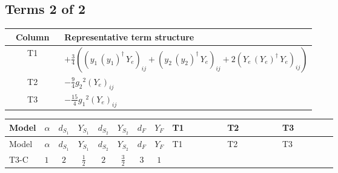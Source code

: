 \documentclass[8pt]{article}
\begin{document}
\begin{landscape}
\subsection*{Terms 2 of 2}
\begin{center}
\begin{tabular}{@{}c >{\raggedright\arraybackslash}p{0.82\linewidth}@{}}
\toprule
Column & Representative term structure \\
\midrule
T1 & \(\displaystyle +\frac{3}{4} (\left({y_1}\,\left({y_1}\right)^{\dagger}\,{Y_e}\right)_{ij}+\left({y_2}\,\left({y_2}\right)^{\dagger}\,{Y_e}\right)_{ij}+2 \left({Y_e}\,\left({Y_e}\right)^{\dagger}\,{Y_e}\right)_{ij})\) \\
\midrule
T2 & \(\displaystyle -\frac{9}{4} {g_2}^2 \left({Y_e}\right)_{ij}\) \\
\midrule
T3 & \(\displaystyle -\frac{15}{4} {g_1}^2 \left({Y_e}\right)_{ij}\) \\
\midrule
\bottomrule
\end{tabular}
\end{center}
\smallskip
\tiny
\begin{longtable}{@{}llcccccc >{\raggedright\arraybackslash}p{0.21\linewidth} >{\raggedright\arraybackslash}p{0.21\linewidth} >{\raggedright\arraybackslash}p{0.21\linewidth}@{}}
\toprule
Model & $\alpha$ & $d_{S_1}$ & $Y_{S_1}$ & $d_{S_2}$ & $Y_{S_2}$ & $d_F$ & $Y_F$ & T1 & T2 & T3 \\
\midrule
\endfirsthead
\toprule
Model & $\alpha$ & $d_{S_1}$ & $Y_{S_1}$ & $d_{S_2}$ & $Y_{S_2}$ & $d_F$ & $Y_F$ & T1 & T2 & T3 \\
\midrule
\endhead
T3-C & $1$ & $2$ & $\frac{1}{2}$ & $2$ & $\frac{3}{2}$ & $3$ & $1$ & \scriptsize\adjustbox{max width=\linewidth}{$\begin{gathered} +\frac{3}{4} (\left({y_1}\,\left({y_1}\right)^{\dagger}\,{Y_e}\right)_{ij}+\left({y_2}\,\left({y_2}\right)^{\dagger}\,{Y_e}\right)_{ij}+2 \left({Y_e}\,\left({Y_e}\right)^{\dagger}\,{Y_e}\right)_{ij})\end{gathered}$} & \scriptsize\adjustbox{max width=\linewidth}{$\begin{gathered} -\frac{9}{4} {g_2}^2 \left({Y_e}\right)_{ij}\end{gathered}$} & \scriptsize\adjustbox{max width=\linewidth}{$\begin{gathered} -\frac{15}{4} {g_1}^2 \left({Y_e}\right)_{ij}\end{gathered}$} \\
\midrule
\bottomrule
\end{longtable}
\clearpage

\end{landscape}
\end{document}
